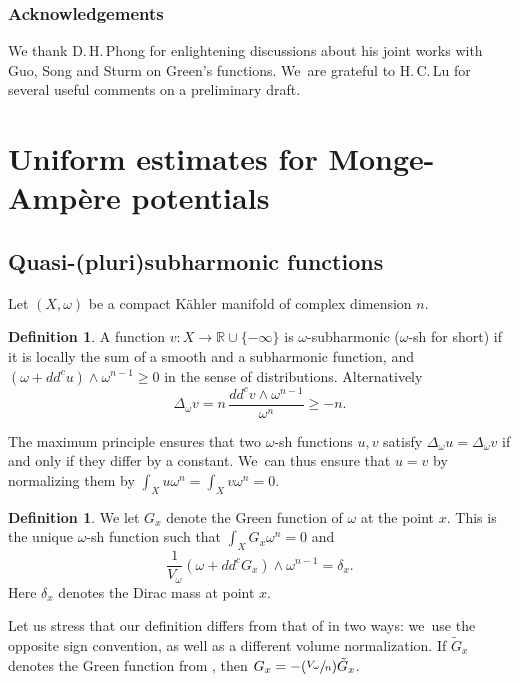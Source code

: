 \documentclass[JEP,XML,SOM,Unicode,published]{cedram}
\newcommand{\Psfrac}[2]{(\sfrac{#1}{#2})}
\theoremstyle{definition}
\newtheorem{defi}[theorem]{Definition}
\newcommand{\R}{\mathbb R}
\begin{document}
\subsubsection*{Acknowledgements}
We thank D.\,H.\,Phong for enlightening discussions about his joint works with Guo, Song and Sturm on Green's functions. We~are grateful to H.\,C.\,Lu for several useful comments on a preliminary draft.

\section{Uniform estimates for Monge-Ampère potentials}

\subsection{Quasi-(pluri)subharmonic functions}

Let $(X, \omega)$ be a compact Kähler manifold of complex dimension $n$.


\begin{defi}
A function $v:X \rightarrow \R \cup \{-\infty\}$
is $\omega$-subharmonic ($\omega$-sh for short) if it is locally the sum of a smooth and a subharmonic function, and
$(\omega+dd^c u) \wedge \omega^{n-1} \geq 0$ in the sense of distributions.
Alternatively
\[
\Delta_{\omega} v=n\, \frac{dd^c v \wedge \omega^{n-1}}{\omega^n} \geq -n.
\]
\end{defi}

The maximum principle ensures that two $\omega$-sh functions $u,v$ satisfy $\Delta_{\omega} u=\Delta_{\omega} v$ if and only if they differ by a constant. We~can thus ensure that $u=v$ by normalizing them
by $\int_X u \omega^n=\int_X v \omega^n=0$.

\begin{defi} \label{def:green}
We let $G_x$ denote the Green function of $\omega$ at the point $x$.
This is the unique $\omega$-sh function such that $\int_X G_x \omega^n=0$ and
\[
\frac{1}{V_{\omega}} (\omega+dd^c G_x) \wedge \omega^{n-1}=\delta_x.
\]
Here $\delta_x$ denotes the Dirac mass at point $x$.
\end{defi}

Let us stress that our definition differs from that
of \cite{GPSS22} in two ways: we~use the opposite sign convention, as well as a different volume normalization.
If $\tilde{G}_x$ denotes the Green function from \cite{GPSS22}, then
$G_x=-\Psfrac{V_{\omega}}{n}\tilde{G}_x$.
\end{document}
